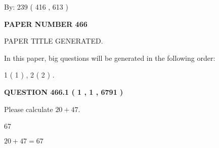 \documentclass[12pt]{article}
\begin{document}
   
\hspace{1.0in} By: 
 239 ( 416 ,  613 )
   
   
   
   
\newpage 
\setcounter{page}{ 
   466001 } 
   
   
   
   
 {\textbf{ \Large{ PAPER NUMBER  466  }}}
   
   
\vspace{0.2in}
   
   
   
   
   
   
   
   
 \vspace{0.2in}
 
 
 
 
   
   
 PAPER TITLE GENERATED.
   
   
   
\vspace{0.2in}
   
In this paper, big questions will be generated in the following order: 
   
   
   1 ( 1 )
 ,
   2 ( 2 )
 .
  
\vspace{0.2in}
  
{\textbf{\Large{QUESTION
466.1 
 ( 1 , 1 , 6791 )
}}}
  
  
 
Please calculate $ %
20 +  %
47 $.
 
 
 
\noindent{}
 
 

67
 
 
\noindent{}
 
 

 
 
 
\noindent{}
 
 

$ %
20 +  %
47=   %
67$
 
 
\noindent{}
 
\end{document}
